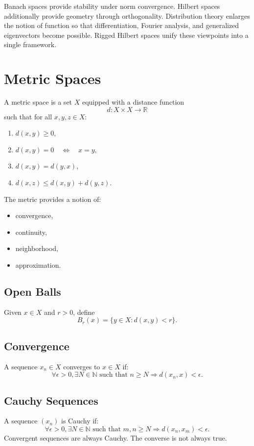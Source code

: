 \documentclass[aps,prl,twocolumn,groupedaddress]{revtex4-2}
\begin{document}
Banach spaces provide stability under norm convergence. Hilbert spaces additionally provide geometry through orthogonality. Distribution theory enlarges the notion of function so that differentiation, Fourier analysis, and generalized eigenvectors become possible. Rigged Hilbert spaces unify these viewpoints into a single framework.

\section{Metric Spaces}

A metric space is a set $X$ equipped with a distance function 
\[
d: X \times X \rightarrow \mathbb{R} 
\]
such that for all $x, y, z \in X$:
\begin{enumerate}
\item $d(x,y) \ge 0$,
\item $d(x,y) = 0 \quad \iff \quad x = y$,
\item $d(x,y) = d(y,x)$,
\item $d(x,z) \le d(x,y) + d(y,z)$.
\end{enumerate}

The metric provides a notion of:
\begin{itemize}
\item convergence,
\item continuity,
\item neighborhood,
\item approximation.
\end{itemize}

\subsection{Open Balls}
Given $x \in X$ and $r > 0$, define 
\[
B_r(x) = \{y \in X : d(x,y) < r\}.
\]

\subsection{Convergence}
A sequence $x_n \in X$ converges to $x \in X$ if:
\[
\forall \epsilon > 0, \exists N \in \mathbb{N} \text{ such that } n \ge N \Rightarrow d(x_n, x) < \epsilon.
\]

\subsection{Cauchy Sequences}
A sequence $(x_n)$ is Cauchy if:
\[
\forall \epsilon > 0, \exists N \in \mathbb{N} \text{ such that } m,n \ge N \Rightarrow d(x_n, x_m) < \epsilon.
\]
Convergent sequences are always Cauchy. The converse is not always true.
\end{document}
